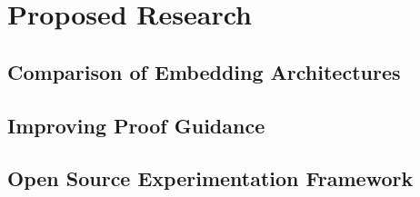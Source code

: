\documentclass{article}
\begin{document}
    \section{Proposed Research}\label{sec:proposed-research}

    \subsection{Comparison of Embedding Architectures}\label{subsec:comparison-of-embedding-architectures}

    \subsection{Improving Proof Guidance}\label{subsec:proof-guidance}

    \subsection{Open Source Experimentation Framework}\label{subsec:open-source-experimentation-framework}
\end{document}
